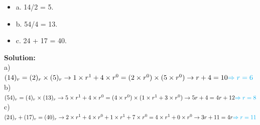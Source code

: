 \documentclass[a4paper,12pt]{extarticle}
\begin{document}
\begin{itemize}
\item a. 14/2 = 5.
\item b. 54/4 = 13.
\item c. 24 + 17 = 40.
\end{itemize}
{\color{blue}\textbf{Solution:}}\\[0.3cm]
\indent \color{red} a) $\color{black} (14)_r = (2)_r \times (5)_r \rightarrow 1 \times r^1 + 4 \times r^0 = (2 \times r^0) \times (5  \times r^0) \rightarrow r + 4 = 10 { \color{cyan} \Rightarrow r =6}$\\[0.4cm]
\indent \color{red} b) $\color{black} (54)_r = (4)_r \times (13)_r \rightarrow 5 \times r^1 + 4 \times r^0 = (4 \times r^0) \times (1  \times r^1 + 3  \times r^0) \rightarrow 5r +4 = 4r + 12 { \color{cyan} \Rightarrow r =8}$\\[0.4cm]
\indent \color{red} c) $\color{black} (24)_r + (17)_r = (40)_r  \rightarrow 2 \times r^1 + 4 \times r^0 + 1 \times r^1 + 7 \times r^0 = 4 \times r^1 + 0 \times r^0 \rightarrow 3r +11 = 4r { \color{cyan} \Rightarrow r =11}$ \color{black}\\[0.4cm]
\newpage
\end{document}

